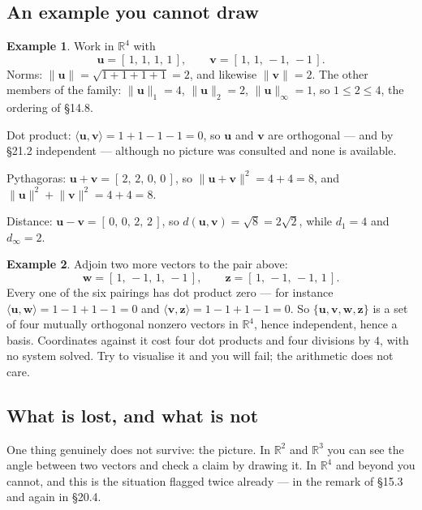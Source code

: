\documentclass[11pt]{article}
\theoremstyle{definition}
\newtheorem{ex}{Example}[section]
\theoremstyle{remark}
\newcommand{\R}{\mathbb{R}}
\newcommand{\vc}[1]{\mathbf{#1}}
\newcommand{\norm}[1]{\lVert #1\rVert}
\begin{document}
\subsection{An example you cannot draw}
\begin{ex}
Work in $\R^{4}$ with
\[
  \vc{u} = [\,1,\,1,\,1,\,1\,],
  \qquad
  \vc{v} = [\,1,\,1,\,-1,\,-1\,] .
\]
Norms: $\norm{\vc{u}}=\sqrt{1+1+1+1}=2$, and likewise $\norm{\vc{v}}=2$. The
other members of the family: $\norm{\vc{u}}_1=4$, $\norm{\vc{u}}_2=2$,
$\norm{\vc{u}}_\infty=1$, so $1\le2\le4$, the ordering of \S14.8.

Dot product: $\langle\vc{u},\vc{v}\rangle = 1+1-1-1 = 0$, so $\vc{u}$ and
$\vc{v}$ are orthogonal --- and by \S21.2 independent --- although no picture
was consulted and none is available.

Pythagoras: $\vc{u}+\vc{v}=[\,2,\,2,\,0,\,0\,]$, so
$\norm{\vc{u}+\vc{v}}^{2}=4+4=8$, and $\norm{\vc{u}}^{2}+\norm{\vc{v}}^{2}=4+4=8$.
\checkmark

Distance: $\vc{u}-\vc{v}=[\,0,\,0,\,2,\,2\,]$, so $d(\vc{u},\vc{v})=\sqrt{8}=2\sqrt2$,
while $d_1=4$ and $d_\infty=2$.
\end{ex}

\begin{ex}
Adjoin two more vectors to the pair above:
\[
  \vc{w} = [\,1,\,-1,\,1,\,-1\,],
  \qquad
  \vc{z} = [\,1,\,-1,\,-1,\,1\,] .
\]
Every one of the six pairings has dot product zero --- for instance
$\langle\vc{u},\vc{w}\rangle = 1-1+1-1 = 0$ and
$\langle\vc{v},\vc{z}\rangle = 1-1+1-1 = 0$. So $\{\vc{u},\vc{v},\vc{w},\vc{z}\}$
is a set of four mutually orthogonal nonzero vectors in $\R^{4}$, hence
independent, hence a basis. Coordinates against it cost four dot products and
four divisions by $4$, with no system solved. Try to visualise it and you will
fail; the arithmetic does not care.
\end{ex}

\subsection{What is lost, and what is not}
One thing genuinely does not survive: the picture. In $\R^{2}$ and $\R^{3}$ you
can see the angle between two vectors and check a claim by drawing it. In
$\R^{4}$ and beyond you cannot, and this is the situation flagged twice already
--- in the remark of \S15.3 and again in \S20.4.
\end{document}

